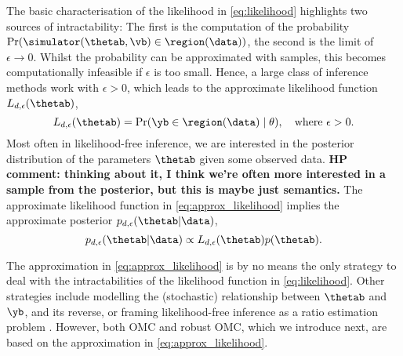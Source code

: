 The basic characterisation of the likelihood in \eqref{eq:likelihood}
highlights two sources of intractability: The first is the computation
of the probability $\Pr(\simulator(\thetab,\vb) \in \region(\data))$,
the second is the limit of $\epsilon \to 0$.  Whilst the probability
can be approximated with samples, this becomes computationally
infeasible if $\epsilon$ is too small. Hence, a large class of
inference methods work with $\epsilon >0$, which leads to the
approximate likelihood function $L_{d, \epsilon}(\thetab)$,
\begin{equation} \label{eq:approx_likelihood}
  L_{d, \epsilon}(\thetab) = \Pr(\yb \in \region(\data) \mid \theta), \quad \text{where  } \epsilon > 0.
\end{equation}
Most often in likelihood-free inference, we are interested in the
posterior distribution of the parameters $\thetab$ given some observed
data. \textbf{HP comment: thinking about it, I think we're often more 
interested in a sample from the posterior, but this is maybe just semantics.} The approximate likelihood function in
\eqref{eq:approx_likelihood} implies the approximate posterior
$p_{d,\epsilon}(\thetab|\data)$,
\begin{equation} \label{eq:approx_posterior}
  p_{d,\epsilon}(\thetab|\data) \propto L_{d, \epsilon}(\thetab) p(\thetab).
\end{equation}

The approximation in \eqref{eq:approx_likelihood} is by no means the
only strategy to deal with the intractabilities of the likelihood
function in \eqref{eq:likelihood}. Other strategies include modelling
the (stochastic) relationship between $\thetab$ and $\yb$, and its
reverse, or framing likelihood-free inference as a ratio estimation
problem \citep[see e.g.\ ][]{Blum2010, Wood2010, Papamakarios2016,
  Thomas2016, Papamakarios2019, Chen2019, Thomas2020,
  Hermans2020}. However, both OMC and robust OMC, which we introduce
next, are based on the approximation in \eqref{eq:approx_likelihood}.





